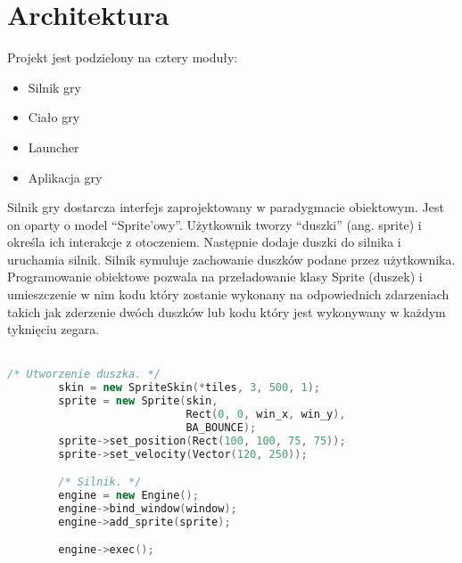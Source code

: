 \documentclass[12pt, titlepage]{article}
\begin{document}
\newpage
\section{Architektura}
Projekt jest podzielony na cztery moduły:
\begin{itemize}
	\item Silnik gry
	\item Ciało gry
	\item Launcher
	\item Aplikacja gry
\end{itemize}

\noindent
Silnik gry dostarcza interfejs zaprojektowany w
paradygmacie obiektowym. Jest on oparty o model
"`Sprite'owy"'. Użytkownik tworzy "`duszki"' (ang.
sprite) i określa ich interakcje z otoczeniem.
Następnie dodaje duszki do silnika i uruchamia
silnik. Silnik symuluje zachowanie duszków
podane przez użytkownika. Programowanie obiektowe
pozwala na przeładowanie klasy Sprite (duszek) i
umieszczenie w nim kodu który zostanie wykonany na
odpowiednich zdarzeniach takich jak zderzenie dwóch
duszków lub kodu który jest wykonywany w każdym
tyknięciu zegara.
\\~
\begin{lstlisting}[language=C++, caption=Interfejs silnika - kod poglądowy]
        /* Utworzenie duszka. */
        skin = new SpriteSkin(*tiles, 3, 500, 1);
        sprite = new Sprite(skin,
                            Rect(0, 0, win_x, win_y),
                            BA_BOUNCE);
        sprite->set_position(Rect(100, 100, 75, 75));
        sprite->set_velocity(Vector(120, 250));

        /* Silnik. */
        engine = new Engine();
        engine->bind_window(window);
        engine->add_sprite(sprite);

        engine->exec();
\end{lstlisting}
\end{document}
